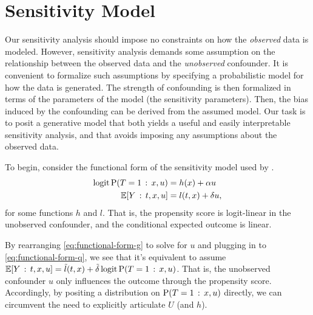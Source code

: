 \documentclass{article}
\begin{document}
\section{Sensitivity Model}

Our sensitivity analysis should impose no constraints on how the \emph{observed} data is modeled.
%
However, sensitivity analysis demands some assumption on the relationship between the observed data
and the \emph{unobserved} confounder.
It is convenient to formalize such
assumptions by specifying a probabilistic model for how the data is generated.
%
The strength of confounding is then formalized in terms of the parameters
of the model (the sensitivity parameters).
Then, the bias induced by the confounding can be derived from the assumed model.
Our task is to posit a generative model that both yields a useful and easily interpretable sensitivity analysis,
and that avoids imposing any assumptions about the observed data.

To begin, consider the functional form of the
sensitivity model used by \citet{Imbens:2003}.
\begin{align}
\logit\Pr(T=1\given x,u) & =h(x)+\alpha u\label{eq:functional-form-g} \\
\EE[Y\given t,x,u] & =l(t,x)+\delta u,\label{eq:functional-form-q}
\end{align}
for some functions $h$ and $l$. That is, the propensity score is
logit-linear in the unobserved confounder, and the conditional expected
outcome is linear.

By rearranging \cref{eq:functional-form-g} to
solve for $u$ and plugging in to \cref{eq:functional-form-q}, we see that
it's equivalent to assume $\EE[Y\given t,x,u] =\tilde{l}(t,x)+\tilde{\delta} \logit\Pr(T=1\given x,u)$.
That is, the unobserved confounder $u$ only influences the outcome through
the propensity score.
Accordingly, by positing a distribution on $\Pr(T=1\given x,u)$ directly,
we can circumvent the need to explicitly articulate $U$ (and $h$).
%
%
\end{document}
